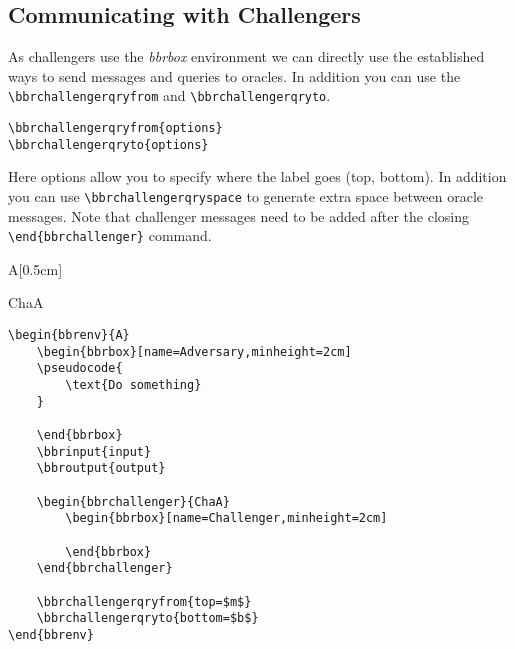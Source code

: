 \documentclass[a4paper]{report}
\begin{document}
\subsection{Communicating with Challengers}
As challengers use the \emph{bbrbox} environment we can directly use the established ways to send messages and
queries to oracles. In addition you can use the \lstinline$\bbrchallengerqryfrom$ and \lstinline$\bbrchallengerqryto$.
\begin{lstlisting}
\bbrchallengerqryfrom{options}
\bbrchallengerqryto{options}
\end{lstlisting}
Here options allow you to specify where the label goes (top, bottom). In addition you can use
\lstinline$\bbrchallengerqryspace$ to generate extra space between oracle messages. Note
that challenger messages need to be added after the closing \lstinline$\end{bbrchallenger}$ command.

\vspace{2em}
\begin{bbrenv}[1cm]{A}[0.5cm]
	\begin{bbrbox}[name=Adversary,minheight=2cm]

	\end{bbrbox}

	\begin{bbrchallenger}{ChaA}
		\begin{bbrbox}[name=Challenger,minheight=2cm]
		
		\end{bbrbox}
	\end{bbrchallenger}

\end{bbrenv}

\begin{lstlisting}
\begin{bbrenv}{A}
	\begin{bbrbox}[name=Adversary,minheight=2cm]
	\pseudocode{
		\text{Do something} 
	}

	\end{bbrbox}
	\bbrinput{input}
	\bbroutput{output}

	\begin{bbrchallenger}{ChaA}
		\begin{bbrbox}[name=Challenger,minheight=2cm]
		
		\end{bbrbox}
	\end{bbrchallenger}

	\bbrchallengerqryfrom{top=$m$}
	\bbrchallengerqryto{bottom=$b$}
\end{bbrenv}
\end{lstlisting}
\end{document}

